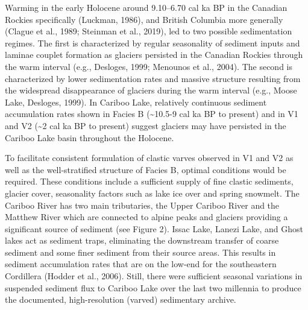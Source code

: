 \documentclass[
  letterpaper,
  DIV=11,
  numbers=noendperiod]{scrartcl}
\begin{document}
Warming in the early Holocene around 9.10--6.70 cal ka BP in the
Canadian Rockies specifically (Luckman, 1986), and British Columbia more
generally (Clague et al., 1989; Steinman et al., 2019), led to two
possible sedimentation regimes. The first is characterized by regular
seasonality of sediment inputs and laminae couplet formation as glaciers
persisted in the Canadian Rockies through the warm interval (e.g.,
Desloges, 1999; Menounos et al., 2004). The second is characterized by
lower sedimentation rates and massive structure resulting from the
widespread disappearance of glaciers during the warm interval (e.g.,
Moose Lake, Desloges, 1999). In Cariboo Lake, relatively continuous
sediment accumulation rates shown in Facies B (\textasciitilde10.5-9 cal
ka BP to present) and in V1 and V2 (\textasciitilde2 cal ka BP to
present) suggest glaciers may have persisted in the Cariboo Lake basin
throughout the Holocene.

To facilitate consistent formulation of clastic varves observed in V1
and V2 as well as the well-stratified structure of Facies B, optimal
conditions would be required. These conditions include a sufficient
supply of fine clastic sediments, glacier cover, seasonality factors
such as lake ice over and spring snowmelt. The Cariboo River has two
main tributaries, the Upper Cariboo River and the Matthew River which
are connected to alpine peaks and glaciers providing a significant
source of sediment (see Figure 2). Issac Lake, Lanezi Lake, and Ghost
lakes act as sediment traps, eliminating the downstream transfer of
coarse sediment and some finer sediment from their source areas. This
results in sediment accumulation rates that are on the low-end for the
southeastern Cordillera (Hodder et al., 2006). Still, there were
sufficient seasonal variations in suspended sediment flux to Cariboo
Lake over the last two millennia to produce the documented,
high-resolution (varved) sedimentary archive.
\end{document}
